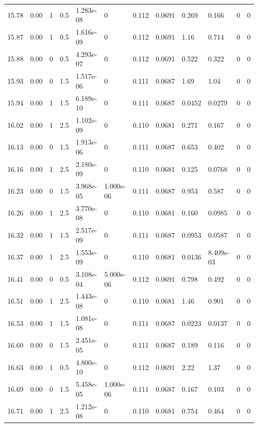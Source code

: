 \documentclass[preview]{standalone}
\begin{document}
{{{{{{{{{\begin{tabular}{L{1.2cm}C{1.2cm} C{0.3cm}C{0.5cm} C{1.4cm}C{1.4cm} C{1.4cm}C{1.4cm} C{1.6cm}C{1.6cm} C{1.6cm}C{1.6cm}}
  15.78  &  0.00  & 1     & 0.5 &  1.283e-08  & 0  &  0.112&   0.0691& 0.269 & 0.166   &  0 & 0  \\ 
  15.87  &  0.00  & 1     & 0.5 &  1.616e-09  & 0  &  0.112&   0.0691& 1.16 & 0.714   &  0 & 0  \\ 
  15.88  &  0.00  & 0     & 0.5 &  4.293e-07  & 0  &  0.112&   0.0691& 0.522 & 0.322   &  0 & 0  \\ 
  15.93  &  0.00  & 0     & 1.5 &  1.517e-06  & 0  &  0.111&   0.0687& 1.69 & 1.04   &  0 & 0  \\ 
  15.94  &  0.00  & 1     & 1.5 &  6.189e-10  & 0  &  0.111&   0.0687& 0.0452 & 0.0279   &  0 & 0  \\ 
  16.02  &  0.00  & 1     & 2.5 &  1.102e-09  & 0  &  0.110&   0.0681& 0.271 & 0.167   &  0 & 0  \\ 
  16.13  &  0.00  & 0     & 1.5 &  1.913e-06  & 0  &  0.111&   0.0687& 0.653 & 0.402   &  0 & 0  \\ 
  16.16  &  0.00  & 1     & 2.5 &  2.180e-09  & 0  &  0.110&   0.0681& 0.125 & 0.0768   &  0 & 0  \\ 
  16.23  &  0.00  & 0     & 1.5 &  3.968e-05  & 1.000e-06  &  0.111&   0.0687& 0.953 & 0.587   &  0 & 0  \\ 
  16.26  &  0.00  & 1     & 2.5 &  3.770e-08  & 0  &  0.110&   0.0681& 0.160 & 0.0985   &  0 & 0  \\ 
  16.32  &  0.00  & 1     & 1.5 &  2.517e-09  & 0  &  0.111&   0.0687& 0.0953 & 0.0587   &  0 & 0  \\ 
  16.37  &  0.00  & 1     & 2.5 &  1.553e-09  & 0  &  0.110&   0.0681& 0.0136 & 8.409e-03   &  0 & 0  \\ 
  16.41  &  0.00  & 0     & 0.5 &  3.108e-04  & 5.000e-06  &  0.112&   0.0691& 0.798 & 0.492   &  0 & 0  \\ 
  16.51  &  0.00  & 1     & 2.5 &  1.443e-08  & 0  &  0.110&   0.0681& 1.46 & 0.901   &  0 & 0  \\ 
  16.53  &  0.00  & 1     & 1.5 &  1.081e-08  & 0  &  0.111&   0.0687& 0.0223 & 0.0137   &  0 & 0  \\ 
  16.60  &  0.00  & 0     & 1.5 &  2.451e-05  & 0  &  0.111&   0.0687& 0.189 & 0.116   &  0 & 0  \\ 
  16.63  &  0.00  & 1     & 0.5 &  4.800e-10  & 0  &  0.112&   0.0691& 2.22 & 1.37   &  0 & 0  \\ 
  16.69  &  0.00  & 0     & 1.5 &  5.458e-05  & 1.000e-06  &  0.111&   0.0687& 0.167 & 0.103   &  0 & 0  \\ 
  16.71  &  0.00  & 1     & 2.5 &  1.212e-08  & 0  &  0.110&   0.0681& 0.754 & 0.464   &  0 & 0  \\ 

\end{tabular}}}}}}}}}}
\end{document}
